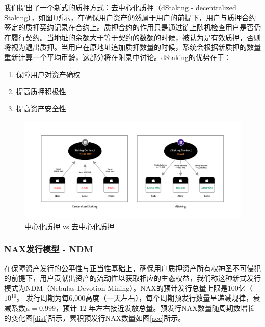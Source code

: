 我们提出了一个新式的质押方式：去中心化质押（dStaking - decentralized Staking），如图\ref{fig:dStaking}所示，在确保用户资产仍然属于用户的前提下，用户与质押合约签定的质押契约记录在合约上。质押合约的作用只是通过链上随机检查用户是否仍在履行契约。当地址的余额大于等于契约的数额的时候，被认为是有效质押，否则将视为退出质押。当用户在原地址追加质押数量的时候，系统会根据新质押的数量重新计算一个平均币龄，这部分将在附录中讨论。dStaking的优势在于：
\begin{enumerate}[\hspace{2cm}(a)]
    \item 保障用户对资产确权
    \item 提高质押积极性
    \item 提高资产安全性
\end{enumerate}

\begin{figure}[htbp]
  \centering
  \includegraphics[width=1\textwidth]{../common/dStaking.pdf}
  \caption{中心化质押 vs 去中心化质押\label{fig:dStaking}}
\end{figure}

\subsubsection{NAX发行模型 - NDM}
在保障资产发行的公平性与正当性基础上，确保用户质押资产所有权神圣不可侵犯的前提下，用户贡献出资产的流动性以获取相应的生态权益，我们称这种新式发行模式为NDM（Nebulas Devotion Mining）。NAX的预计发行总量上限是100亿（\(10^{10}\)。 发行周期为每6,000高度（一天左右），每个周期预发行数量呈递减规律，衰减系数$\mu=0.999$，预计 12 年左右接近发放总量。预发行NAX数量随周期数增长的变化图\ref{dist}所示，累积预发行NAX数量如图\ref{acc}所示。

